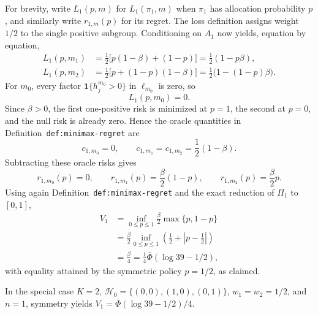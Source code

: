 For brevity, write \(L_1(p,m)\) for \(L_1(\pi_1,m)\) when \(\pi_1\) has allocation probability \(p\), and similarly write \(r_{1,m}(p)\) for its regret.  The loss definition assigns weight \(1/2\) to the single positive subgroup.  Conditioning on \(A_1\) now yields, equation by equation,
\[
\begin{aligned}
 L_1(p,m_1)
 &=\frac12\bigl[p(1-\beta)+(1-p)\bigr]
 =\frac12(1-p\beta),\\
 L_1(p,m_2)
 &=\frac12\bigl[p+(1-p)(1-\beta)\bigr]
 =\frac12\bigl(1-(1-p)\beta\bigr).
\end{aligned}
\]
For \(m_0\), every factor \(\mathbf 1\{h_j^{m_0}>0\}\) in \(\ell_{m_0}\) is zero, so
\[
 L_1(p,m_0)=0.
\]
Since \(\beta>0\), the first one-positive risk is minimized at \(p=1\), the second at \(p=0\), and the null risk is already zero.  Hence the oracle quantities in Definition~\texttt{def:minimax-regret} are
\[
 c_{1,m_0}=0,
 \qquad
 c_{1,m_1}=c_{1,m_2}=\frac12(1-\beta).
\]
Subtracting these oracle risks gives
\[
 r_{1,m_0}(p)=0,
 \qquad
 r_{1,m_1}(p)=\frac{\beta}{2}(1-p),
 \qquad
 r_{1,m_2}(p)=\frac{\beta}{2}p.
\]
Using again Definition~\texttt{def:minimax-regret} and the exact reduction of \(\Pi_1\) to \([0,1]\),
\[
\begin{aligned}
 V_1
 &=\inf_{0\leq p\leq1}\frac{\beta}{2}\max\{p,1-p\}\\
 &=\frac{\beta}{2}\inf_{0\leq p\leq1}
 \left(\frac12+\left|p-\frac12\right|\right)\\
 &=\frac{\beta}{4}
 =\frac14\overline\Phi(\log 39-1/2),
\end{aligned}
\]
with equality attained by the symmetric policy \(p=1/2\), as claimed.

In the special case \(K=2\), \(\mathcal H_0=\{(0,0),(1,0),(0,1)\}\), \(w_1=w_2=1/2\), and \(n=1\), symmetry yields \(V_1=\overline\Phi(\log 39-1/2)/4\).

